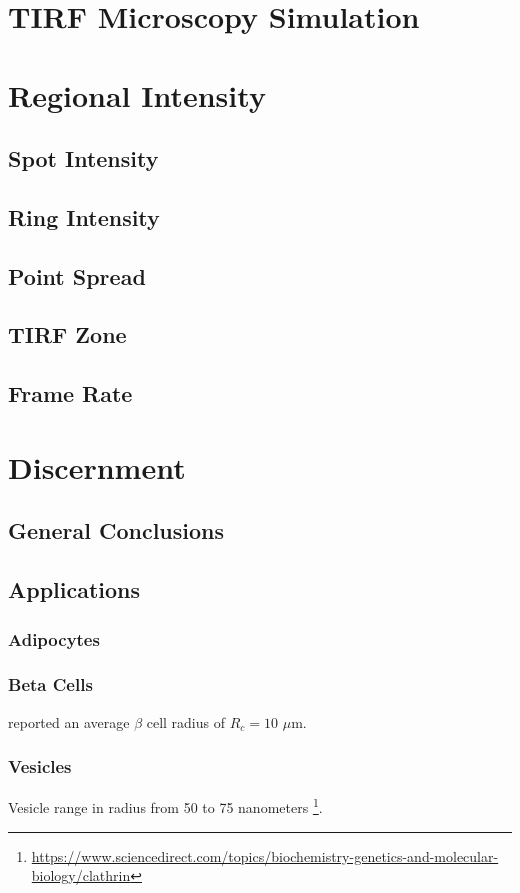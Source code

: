 \documentclass{report}
\begin{document}
\chapter{TIRF Microscopy Simulation}
\chapter{Regional Intensity}
\section{Spot Intensity}
\section{Ring Intensity}
\section{Point Spread}
\section{TIRF Zone}
\section{Frame Rate}

\chapter{Discernment}
\section{General Conclusions}
\section{Applications}

\subsection{Adipocytes}
\cite{soula2013modelling}

\subsection{Beta Cells}
\cite{marchetti2017pancreatic} reported an average $\beta$ cell radius of $R_c = 10$ $\mu$m.

\subsection{Vesicles}
Vesicle range in radius from 50 to 75 nanometers \cite{ales2007gene}\footnote{\url{https://www.sciencedirect.com/topics/biochemistry-genetics-and-molecular-biology/clathrin}}.



\end{document}
